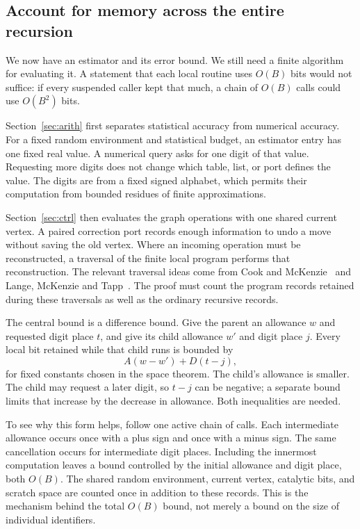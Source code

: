 \subsection{Account for memory across the entire recursion}

We now have an estimator and its error bound. We still need a finite algorithm for evaluating it. A statement that each local routine uses $O(B)$ bits would not suffice: if every suspended caller kept that much, a chain of $O(B)$ calls could use $O(B^2)$ bits.

Section~\ref{sec:arith} first separates statistical accuracy from numerical accuracy. For a fixed random environment and statistical budget, an estimator entry has one fixed real value. A numerical query asks for one digit of that value. Requesting more digits does not change which table, list, or port defines the value. The digits are from a fixed signed alphabet, which permits their computation from bounded residues of finite approximations.

Section~\ref{sec:ctrl} then evaluates the graph operations with one shared current vertex. A paired correction port records enough information to undo a move without saving the old vertex. Where an incoming operation must be reconstructed, a traversal of the finite local program performs that reconstruction. The relevant traversal ideas come from Cook and McKenzie~\cite{CookMcKenzie1987} and Lange, McKenzie and Tapp~\cite{LMT2000}. The proof must count the program records retained during these traversals as well as the ordinary recursive records.

The central bound is a difference bound. Give the parent an allowance $w$ and requested digit place $t$, and give its child allowance $w'$ and digit place $j$. Every local bit retained while that child runs is bounded by
\[
 A(w-w')+D(t-j),
\]
for fixed constants chosen in the space theorem. The child's allowance is smaller. The child may request a later digit, so $t-j$ can be negative; a separate bound limits that increase by the decrease in allowance. Both inequalities are needed.

To see why this form helps, follow one active chain of calls. Each intermediate allowance occurs once with a plus sign and once with a minus sign. The same cancellation occurs for intermediate digit places. Including the innermost computation leaves a bound controlled by the initial allowance and digit place, both $O(B)$. The shared random environment, current vertex, catalytic bits, and scratch space are counted once in addition to these records. This is the mechanism behind the total $O(B)$ bound, not merely a bound on the size of individual identifiers.

